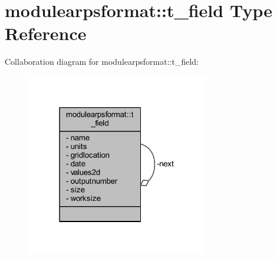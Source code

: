 \hypertarget{structmodulearpsformat_1_1t__field}{}\section{modulearpsformat\+:\+:t\+\_\+field Type Reference}
\label{structmodulearpsformat_1_1t__field}


Collaboration diagram for modulearpsformat\+:\+:t\+\_\+field\+:\nopagebreak
\begin{figure}[H]
\begin{center}
\leavevmode
\includegraphics[width=226pt]{structmodulearpsformat_1_1t__field__coll__graph}
\end{center}
\end{figure}
